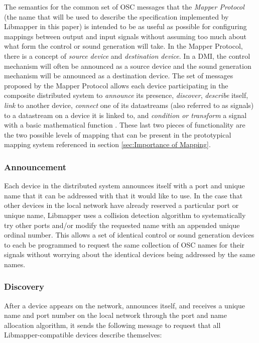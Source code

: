 The semantics for the common set of OSC messages that the \emph{Mapper Protocol} (the name that will be used to describe the specification implemented by Libmapper in this paper) is intended to be as useful as possible for configuring mappings between output and input signals without assuming too much about what form the control or sound generation will take. In the Mapper Protocol, there is a concept of \emph{source device} and \emph{destination device}. In a DMI, the control mechanism will often be announced as a source device and the sound generation mechanism will be announced as a destination device. The set of messages proposed by the Mapper Protocol allows each device participating in the composite distributed system to \emph{announce} its presence, \emph{discover}, \emph{describe} itself, \emph{link} to another device, \emph{connect} one of its datastreams (also referred to as signals) to a datastream on a device it is linked to, and \emph{condition or transform} a signal with a basic mathematical function \cite{Malloch2009}. These last two pieces of functionality are the two possible levels of mapping that can be present in the prototypical mapping system referenced in section \ref{sec:Importance of Mapping}.

\subsubsection{Announcement}

Each device in the distributed system announces itself with a port and unique name that it can be addressed with that it would like to use. In the case that other devices in the local network have already reserved a particular port or unique name, Libmapper uses a collision detection algorithm to systematically try other ports and/or modify the requested name with an appended unique ordinal number. This allows a set of identical control or sound generation devices to each be programmed to request the same collection of OSC names for their signals without worrying about the identical devices being addressed by the same names.

\subsubsection{Discovery}

After a device appears on the network, announces itself, and receives a unique name and port number on the local network through the port and name allocation algorithm, it sends the following message to request that all Libmapper-compatible devices describe themselves:

